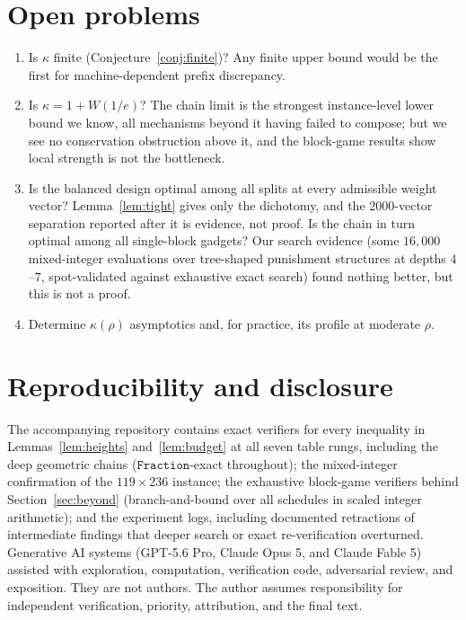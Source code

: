 \documentclass[11pt]{article}
\theoremstyle{definition}
\newcommand{\W}{W}
\begin{document}
\section{Open problems}

\begin{enumerate}
\item Is $\kappa$ finite (Conjecture~\ref{conj:finite})?  Any finite
upper bound would be the first for machine-dependent prefix discrepancy.
\item Is $\kappa=1+\W(1/e)$?  The chain limit is the strongest
instance-level lower bound we know, all mechanisms beyond it having
failed to compose; but we see no conservation obstruction above it, and
the block-game results show local strength is not the bottleneck.
\item Is the balanced design optimal among all splits at every admissible
weight vector?  Lemma~\ref{lem:tight} gives only the dichotomy, and the
$2000$-vector separation reported after it is evidence, not proof.  Is the
chain in turn optimal among all single-block gadgets?  Our search
evidence (some $16{,}000$ mixed-integer evaluations over tree-shaped
punishment structures at depths $4$--$7$, spot-validated against
exhaustive exact search) found nothing better, but this is not a proof.
\item Determine $\kappa(\rho)$ asymptotics and, for practice, its profile
at moderate $\rho$.
\end{enumerate}

\section*{Reproducibility and disclosure}

The accompanying repository contains exact verifiers for every inequality
in Lemmas~\ref{lem:heights} and~\ref{lem:budget} at all seven table
rungs, including the deep geometric chains ($\texttt{Fraction}$-exact
throughout); the mixed-integer confirmation of the $119\times236$
instance; the exhaustive block-game verifiers behind
Section~\ref{sec:beyond} (branch-and-bound over all schedules in scaled
integer arithmetic); and the experiment logs, including documented retractions of intermediate
findings that deeper search or exact re-verification overturned.
Generative AI systems (GPT-5.6 Pro, Claude Opus 5, and Claude Fable 5)
assisted with exploration, computation, verification code, adversarial
review, and exposition.  They are not authors.  The author assumes
responsibility for independent verification, priority, attribution, and
the final text.



\end{document}
